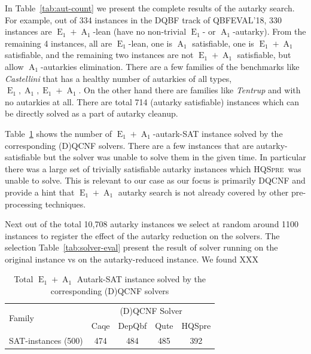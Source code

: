 \documentclass[runningheads]{llncs}
\DeclareMathOperator{\Aaut}{A}
\DeclareMathOperator{\Eaut}{E}
\newcommand{\hqspre}{\textsc{HQSpre}}
\begin{document}
In Table~\ref{tab:aut-count} we present the complete results of the autarky search. For example, out of 334 instances in the DQBF track of QBFEVAL'18, 330 instances are $\Eaut_1+\Aaut_1$-lean (have no non-trivial $\Eaut_1$- or $\Aaut_1$-autarky). From the remaining 4 instances, all are $\Eaut_1$-lean, one is $\Aaut_1$ satisfiable, one is $\Eaut_1+\Aaut_1$ satisfiable, and the remaining two instances are not $\Eaut_1+\Aaut_1$ satisfiable, but allow $\Aaut_1$-autarkies elimination.
%
There are a few families of the benchmarks like \textit{Castellini} that has a healthy number of autarkies of all types, $\Eaut_1,\Aaut_1,\Eaut_1+\Aaut_1$. On the other hand there are families like \textit{Tentrup} and  with no autarkies at all. There are total 714 (autarky satisfiable) instances which can be directly solved as a part of autarky cleanup.

Table~\ref{tab:sat-solver} shows the number of $\Eaut_1+\Aaut_1$-autark-SAT instance solved by the corresponding (D)QCNF solvers. There are a few instances that are autarky-satisfiable but the solver was unable to solve them in the given time. In particular there was a large set of trivially satisfiable autarky instances which \hqspre\ was unable to solve. This is relevant to our case as our focus is primarily DQCNF and provide a hint that $\Eaut_1+\Aaut_1$ autarky search is not already covered by other pre-processing techniques.

Next out of the total 10,708 autarky instances we select at random around 1100 instances to register the effect of the autarky reduction on the solvers. The selection
%
Table~\ref{tab:solver-eval} present the result of solver running on the original instance vs on the autarky-reduced instance. We found XXX



\begin{table}
	\caption{Total $\Eaut_1+\Aaut_1$ Autark-SAT instance solved by the corresponding (D)QCNF solvers}\label{tab:sat-solver}
	\begin{tabular}{l|c|c|c|c}
		
		\hline
		\multirow{2}{3cm}{Family}  & \multicolumn{4}{c}{(D)QCNF Solver} \\
		\cline{2-5}
		& Caqe & DepQbf & Qute & HQSpre  \\
		
		\hline
		
		SAT-instances (500) &  474 & 484 & 485 & 392 \\
		
		\hline
	\end{tabular}
\end{table}
\end{document}
